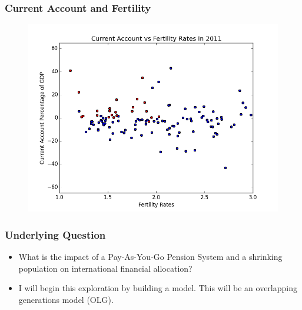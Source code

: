 \documentclass[11pt]{beamer}
\theoremstyle{definition}
\begin{document}
\begin{frame}
    \frametitle{Current Account and Fertility}
\begin{figure}
	\centering
\includegraphics[scale=0.5]{CA_Fert.png}
	\label{V4}
\end{figure}

\end{frame}

\begin{frame}
    \frametitle{Underlying Question}

    \begin{itemize}
        \item What is the impact of a Pay-As-You-Go Pension System and a shrinking population on international financial allocation?
        \item I will begin this exploration by building a model. This will be an overlapping generations model (OLG).

    \end{itemize}


\end{frame}

\end{document}
